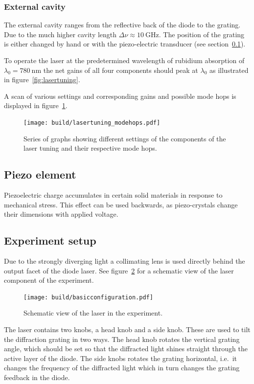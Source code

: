 \subsubsection{External cavity}\label{external-cavity}
The external cavity ranges from the reflective back of the diode to the grating.
Due to the much higher cavity length $\Delta \nu \approx \SI{10}{\giga\hertz}$.
The position of the grating is either changed by hand or with the piezo-electric transducer (see
section~\ref{sub:piezo-element}).

To operate the laser at the predetermined wavelength of rubidium absorption of
$\lambda_0 = \SI{780}{\nano\meter}$ the net gains of all four components should
peak at $\lambda_0$ as illustrated in figure~\ref{fig:lasertuning}.

A scan of various settings and corresponding gains and possible mode hops is
displayed in figure~\ref{fig:lasertuning_modehops}.
\begin{figure}[ht]
  \centering
  \texttt{[image: build/lasertuning\_modehops.pdf]}
  \caption{Series of graphs showing different settings of the  components of
    the laser tuning and their respective mode hops\cite{anleitung}.}%
  \label{fig:lasertuning_modehops}
\end{figure}

\subsection{Piezo element}\label{sub:piezo-element}
Piezoelectric charge accumulates in certain solid materials in response to mechanical stress.
This effect can be used backwards, as piezo-crystals change their dimensions with applied voltage.

\subsection{Experiment setup}\label{experiment-setup}
Due to the strongly diverging light a collimating lens is used directly behind the output facet of
the diode laser.
See figure~\ref{fig:experiment-setup} for a schematic view of the laser component of the
experiment.

\begin{figure}[ht]
  \centering
  \texttt{[image: build/basicconfiguration.pdf]}
  \caption{Schematic view of the laser in the experiment\cite{anleitung}.}%
  \label{fig:experiment-setup}
\end{figure}

The laser contains two knobs, a head knob and a side knob.
These are used to tilt the diffraction grating in two ways.
The head knob rotates the vertical grating angle,
which should be set so that the diffracted light shines straight through the active layer of the
diode.
The side knobs rotates the grating horizontal, i.e.\ it changes the frequency of the diffracted
light which in turn changes the grating feedback in the diode.
